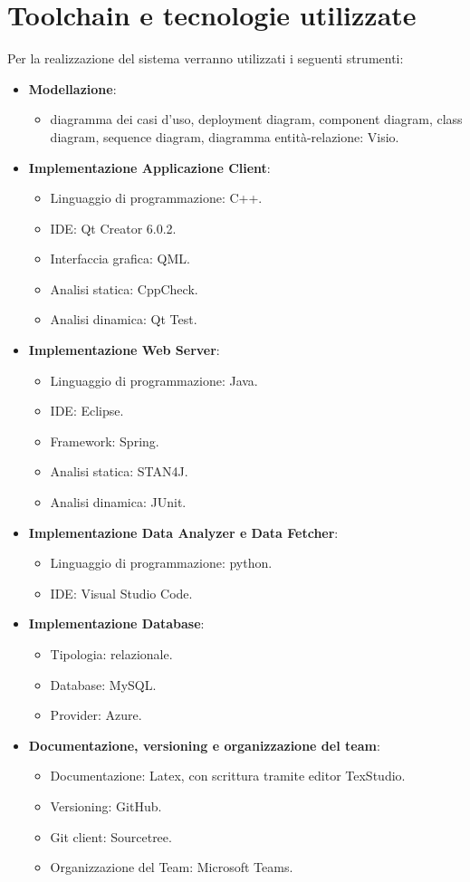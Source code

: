 \section{Toolchain e tecnologie utilizzate}
Per la realizzazione del sistema verranno utilizzati i seguenti strumenti:
\begin{itemize}
	\item \textbf{Modellazione}:
	\begin{itemize}
		\item diagramma dei casi d'uso, deployment diagram, component diagram, class
		diagram, sequence diagram, diagramma entità-relazione: Visio.
	\end{itemize}
	\item \textbf{Implementazione Applicazione Client}:
	\begin{itemize}
		\item Linguaggio di programmazione: C++.
		\item IDE: Qt Creator 6.0.2.
		\item Interfaccia grafica: QML.
		\item Analisi statica: CppCheck.
		\item Analisi dinamica: Qt Test.
	\end{itemize}
	\item \textbf{Implementazione Web Server}:
	\begin{itemize}
		\item Linguaggio di programmazione: Java.
		\item IDE: Eclipse.
		\item Framework: Spring.
		\item Analisi statica: STAN4J.
		\item Analisi dinamica: JUnit.
	\end{itemize}
	\item \textbf{Implementazione Data Analyzer e Data Fetcher}:
	\begin{itemize}
		\item Linguaggio di programmazione: python.
		\item IDE: Visual Studio Code.
	\end{itemize}
	\item \textbf{Implementazione Database}:
	\begin{itemize}
		\item Tipologia: relazionale.
		\item Database: MySQL.
		\item Provider: Azure.
	\end{itemize}
	\item \textbf{Documentazione, versioning e organizzazione del team}:
	\begin{itemize}
		\item Documentazione: Latex, con scrittura tramite editor TexStudio.
		\item Versioning: GitHub.
		\item Git client: Sourcetree.
		\item Organizzazione del Team: Microsoft Teams.
	\end{itemize}
\end{itemize}